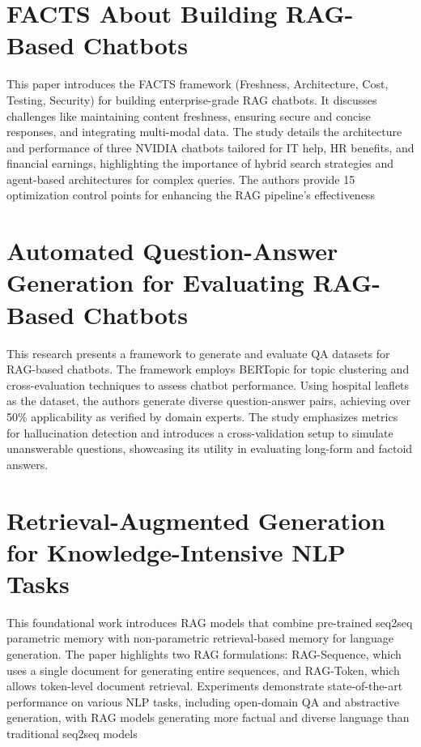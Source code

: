 \documentclass[12pt,a4paper]{report}
\begin{document}
\section{FACTS About Building RAG-Based Chatbots}

This paper introduces the FACTS framework (Freshness, Architecture, Cost, Testing, Security) for building enterprise-grade RAG chatbots. It discusses challenges like maintaining content freshness, ensuring secure and concise responses, and integrating multi-modal data. The study details the architecture and performance of three NVIDIA chatbots tailored for IT help, HR benefits, and financial earnings, highlighting the importance of hybrid search strategies and agent-based architectures for complex queries. The authors provide 15 optimization control points for enhancing the RAG pipeline's effectiveness​


\section{Automated Question-Answer Generation for Evaluating RAG-Based Chatbots}

This research presents a framework to generate and evaluate QA datasets for RAG-based chatbots. The framework employs BERTopic for topic clustering and cross-evaluation techniques to assess chatbot performance. Using hospital leaflets as the dataset, the authors generate diverse question-answer pairs, achieving over 50\% applicability as verified by domain experts. The study emphasizes metrics for hallucination detection and introduces a cross-validation setup to simulate unanswerable questions, showcasing its utility in evaluating long-form and factoid answers.


\section{Retrieval-Augmented Generation for Knowledge-Intensive NLP Tasks}

This foundational work introduces RAG models that combine pre-trained seq2seq parametric memory with non-parametric retrieval-based memory for language generation. The paper highlights two RAG formulations: RAG-Sequence, which uses a single document for generating entire sequences, and RAG-Token, which allows token-level document retrieval. Experiments demonstrate state-of-the-art performance on various NLP tasks, including open-domain QA and abstractive generation, with RAG models generating more factual and diverse language than traditional seq2seq models​
\end{document}
